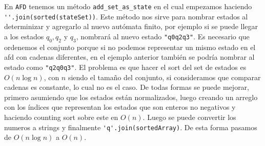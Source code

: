 En \verb|AFD| tenemos un método \verb|add_set_as_state| en el cual empezamos haciendo \verb|''.join(sorted(stateSet))|. Este método nos sirve para nombrar estados al 
determinizar y agregarlo al nuevo autómata finito, por ejemplo si se puede llegar a los estados $q_0, q_2$ y $q_3$, nombrará al nuevo estado \verb|"q0q2q3"|. Es necesario que
ordenemos el conjunto porque si no podemos representar un mismo estado en el afd con cadenas diferentes, en el ejemplo anterior también se podría nombrar al estado como \verb|"q2q0q3"|. El problema
es que hacer el sort del set de estados es $O(n \log{n})$, con $n$ siendo el tamaño del conjunto, si consideramos que comparar cadenas es constante, lo cual no es el caso. 
De todas formas se puede mejorar, primero asumiendo que los estados están normalizados, luego creando un arreglo con los índices que representan los estados que son enteros 
no negativos y haciendo counting sort sobre este en $O(n)$. Luego se puede convertir los numeros a strings y finalmente \verb|'q'.join(sortedArray)|. De esta forma pasamos
de $O(n \log{n})$ a $O(n)$.


